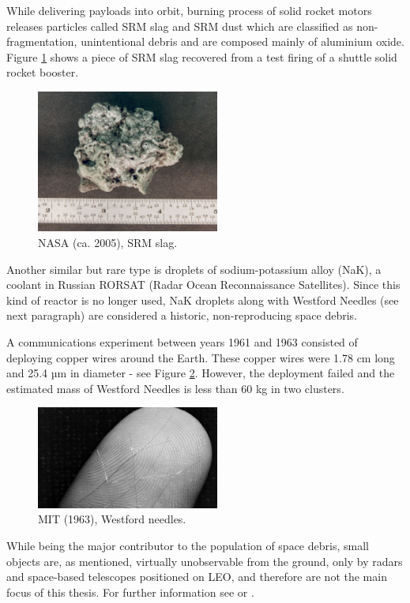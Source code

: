 	While delivering payloads into orbit, burning process of solid rocket motors releases particles called SRM slag and SRM dust which are classified as non-fragmentation, unintentional debris and are composed mainly of aluminium oxide. Figure \ref{fig:srmslag} shows a piece of SRM slag recovered from a test firing of a shuttle solid rocket booster.
	
\begin{figure}[H]
\centering
  \includegraphics[width=6cm]{images/slag}
  \caption{NASA (ca. 2005), SRM slag.}
  \label{fig:srmslag}
\end{figure}	
	
	Another similar but rare type is droplets of sodium-potassium alloy (NaK), a coolant in Russian RORSAT (Radar Ocean Reconnaissance Satellites). Since this kind of reactor is no longer used, NaK droplets along with Westford Needles (see next paragraph) are considered a historic, non-reproducing space debris. 
	
	A communications experiment between years 1961 and 1963 consisted of deploying copper wires around the Earth. These copper wires were 1.78 cm long and 25.4 µm in diameter - see Figure \ref{fig:westfordneedles}. However, the deployment failed and the estimated mass of Westford Needles is less than 60 kg in two clusters.
	
\begin{figure}[H]
\centering
  \includegraphics[width=6cm]{images/westfordneedles}
  \caption{MIT (1963), Westford needles.}
  \label{fig:westfordneedles}
\end{figure}	
	
	While being the major contributor to the population of space debris, small objects are, as mentioned, virtually unobservable from the ground, only by radars and space-based telescopes positioned on LEO, and therefore are not the main focus of this thesis. For further information see \citep{klinkrad2006space} or \citep{Silha2012id}.

